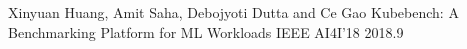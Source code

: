 \begin{cventries}
  \cventry
    {Xinyuan Huang, Amit Saha, Debojyoti Dutta and Ce Gao} %
    {Kubebench: A Benchmarking Platform for ML Workloads} %
    {IEEE AI4I'18} %
    {2018.9} %
    {
    }

\end{cventries}
